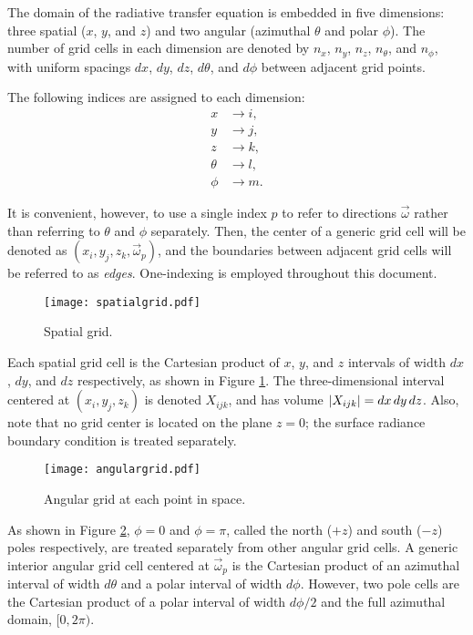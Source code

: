 The domain of the radiative transfer equation is embedded in five dimensions: three spatial ($x$, $y$, and $z$) and two angular (azimuthal $\theta$ and polar $\phi$).
The number of grid cells in each dimension are denoted by $n_x$, $n_y$, $n_z$,
$n_\theta$, and $n_\phi$, with uniform spacings $dx$, $dy$, $dz$, $d\theta$, and
$d\phi$ between adjacent grid points.

The following indices are assigned to each dimension:
\begin{align*}
  x &\to i, \\
  y &\to j, \\
  z &\to k, \\
  \theta &\to l, \\
  \phi &\to m.
\end{align*}

It is convenient, however, to use a single index $p$ to refer to directions $\vec{\omega}$ rather than referring to $\theta$ and $\phi$ separately.
Then, the center of a generic grid cell will be denoted as
$(x_i, y_j, z_k, \vec{\omega}_p)$, and the boundaries between adjacent grid cells
will be referred to as \textit{edges}.
One-indexing is employed throughout this document.

\begin{figure}[H]
  \centering
  \texttt{[image: spatialgrid.pdf]}
  \caption{Spatial grid.}
  \label{fig:spatial_grid}
\end{figure}

Each spatial grid cell is the Cartesian product of $x$, $y$, and $z$ intervals of width $dx$, $dy$, and $dz$ respectively,
as shown in Figure \ref{fig:spatial_grid}.
The three-dimensional interval centered at $(x_i, y_j, z_k)$ is denoted $X_{ijk}$, and has volume $\left| X_{ijk} \right|=dx\,dy\,dz$.
Also, note that no grid center is located on the plane $z=0$; the surface radiance boundary condition is treated separately.

\begin{figure}[H]
  \centering
  \texttt{[image: angulargrid.pdf]}
  \caption{Angular grid at each point in space.}
  \label{fig:angular_grid}
\end{figure}

As shown in Figure \ref{fig:angular_grid}, $\phi=0$ and $\phi=\pi$, called
the north ($+z$) and south ($-z$) poles respectively, are treated separately from other angular grid cells.
A generic interior angular grid cell centered at $\vec{\omega}_p$ is the Cartesian product of an azimuthal interval of width $d\theta$ and a polar interval of width $d\phi$.
However, two pole cells are the Cartesian product of a polar interval of width $d\phi/2$ and the full azimuthal domain, $[0, 2\pi)$.

